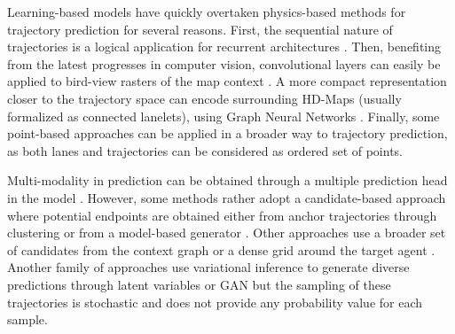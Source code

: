 \documentclass{article} \usepackage{iclr2022_conference,times}
\begin{document}
Learning-based models have quickly overtaken physics-based methods for trajectory prediction for several reasons. First, the sequential nature of trajectories is a logical application for recurrent architectures \citep{alahi2016social, altche2017lstm, lee2017desire, mercat2020multi, khandelwal2020if}. Then, benefiting from the latest progresses in computer vision, convolutional layers can easily be applied to bird-view rasters of the map context \citep{lee2017desire, tang2019multiple, cui2019multimodal, hong2019rules, salzmann2020trajectron++, chai2020multipath, gilles2021home}. A more compact representation closer to the trajectory space can encode surrounding HD-Maps (usually formalized as connected lanelets), using Graph Neural Networks \citep{gao2020vectornet, liang2020learning, zeng2021lanercnn, gilles2021gohome}. Finally, some point-based approaches \citep{ye2021tpcn} can be applied in a broader way to trajectory prediction, as both lanes and trajectories can be considered as ordered set of points.

Multi-modality in prediction can be obtained through a multiple prediction head in the model \citep{cui2019multimodal, liang2020learning, ngiam2021scene, deo2021multimodal}. However, some methods rather adopt a candidate-based approach where potential endpoints are obtained either from anchor trajectories through clustering \citep{chai2020multipath, phan2020covernet} or from a model-based generator \citep{song2021learning}. Other approaches use a broader set of candidates from the context graph \citep{zhang2020map, zhao2020tnt, zeng2021lanercnn, kim2021lapred} or a dense grid around the target agent \citep{deo2020trajectory, gu2021densetnt, gilles2021home, gilles2021gohome}. Another family of approaches use variational inference to generate diverse predictions through latent variables \citep{lee2017desire, rhinehart2018r2p2, tang2019multiple, casas2020implicit} or GAN \citep{gupta2018social, rhinehart2018r2p2, sadeghian2019sophie} but the sampling of these trajectories is stochastic and does not provide any probability value for each sample.
\end{document}
